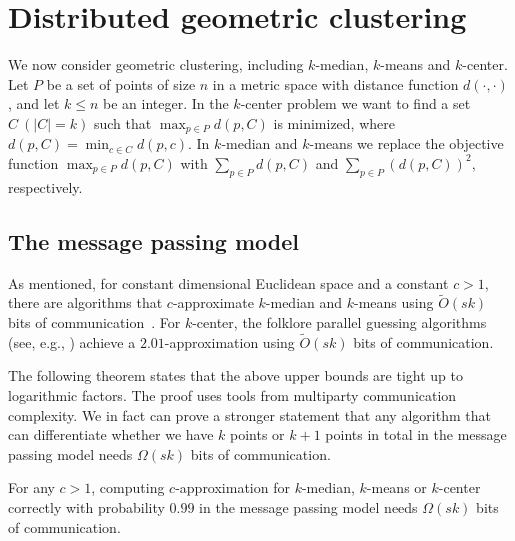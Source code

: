 \section{Distributed geometric clustering\label{sec:geo}}
We now consider geometric clustering, including $k$-median, $k$-means and $k$-center.  Let $P$ be a set of points of size $n$ in a metric space with distance function $d(\cdot, \cdot)$, and let $k \le n$ be an integer. In the $k$-center problem we want to find a set $C\ (|C| = k)$ such that $\max_{p \in P} d(p, C)$ is minimized, where $d(p, C) = \min_{c \in C} d(p, c)$.  In $k$-median and $k$-means we replace the objective function $\max_{p \in P} d(p, C)$ with $\sum_{p \in P} d(p, C)$ and $\sum_{p \in P} (d(p, C))^2$, respectively.

\subsection{The message passing model}
\label{sec:geo-mp}

As mentioned, for constant dimensional Euclidean space and a constant $c > 1$, there are algorithms that $c$-approximate $k$-median and $k$-means using $\tilde{O}(sk)$ bits of communication~\cite{BEL13}.  For $k$-center, the folklore parallel guessing algorithms (see, e.g., \cite{CMZ07}) achieve a $2.01$-approximation using $\tilde{O}(sk)$ bits of communication.  

The following theorem states that the above upper bounds are tight up to logarithmic factors. %
The proof uses tools from multiparty communication complexity.  We in fact can prove a stronger statement that any algorithm that can differentiate whether we have $k$ points or $k+1$ points in total in the message passing model needs $\Omega(sk)$ bits of communication.

\begin{thm}
\label{thm:geometric}
For any $c > 1$, computing $c$-approximation for $k$-median, $k$-means or $k$-center correctly with probability $0.99$ in the message passing model needs $\Omega(sk)$ bits of communication.
\end{thm}

